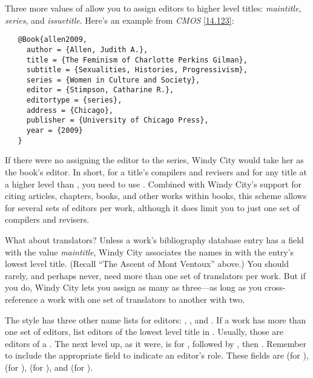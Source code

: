 \documentclass[11pt,letterpaper,oneside]{article}
\begin{document}
Three more values of  allow you to assign editors
to higher level titles: \textit{maintitle}, \textit{series}, and
\textit{issuetitle}. Here's an example from \textit{CMOS}
\ref{14.123}:

\begin{verbatim}
   @Book{allen2009,
     author = {Allen, Judith A.},
     title = {The Feminism of Charlotte Perkins Gilman},
     subtitle = {Sexualities, Histories, Progressivism},
     series = {Women in Culture and Society},
     editor = {Stimpson, Catharine R.},
     editortype = {series},
     address = {Chicago},
     publisher = {University of Chicago Press},
     year = {2009}
   }
\end{verbatim}

\begin{citebib}
\item \cite{allen2009}
\end{citebib}

\noindent If there were no  assigning the editor
to the series, Windy City would take her as the book's editor. In
short, for a title's compilers and revisers and for any title at a
higher level than , you need to use
. Combined with Windy City's support for citing
articles, chapters, books, and other works within books, this scheme
allows for several sets of editors per work, although it does limit
you to just one set of compilers and revisers.

What about translators? Unless a work's bibliography database entry
has a  field with the value
\textit{maintitle}, Windy City associates the names in
 with the entry's lowest level title. (Recall
``The Ascent of Mont Ventoux'' above.) You should rarely, and perhaps
never, need more than one set of translators per work. But if you do,
Windy City lets you assign as many as three---as long as you
cross-reference a work with one set of translators to another with
two.

The style has three other name lists for editors: ,
, and . If a work has more than
one set of editors, list editors of the lowest level title in
. Usually, those are editors of a .
The next level up, as it were, is for , followed by
, then . Remember to include the
appropriate  field to indicate an editor's role. These
fields are  (for ),
 (for ),
 (for ), and
 (for ).
\end{document}
